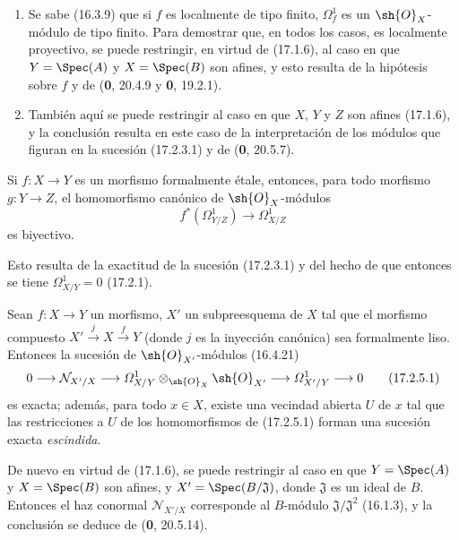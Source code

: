 \begin{enumerate}
  \item[(i)] Se sabe (16.3.9) que si $f$ es localmente de tipo finito, $\varOmega_f^1$ es un $\sh{O}_X$-módulo de tipo finito. Para demostrar que, en todos los casos, es localmente proyectivo, se puede restringir, en virtud de (17.1.6), al caso en que $Y=\Spec(A)$ y $X=\Spec(B)$ son afines, y esto resulta de la hipótesis sobre $f$ y de (\textbf 0, 20.4.9 y \textbf 0, 19.2.1).
  \item[(ii)] También aquí se puede restringir al caso en que $X$, $Y$ y $Z$ son afines (17.1.6), y la conclusión resulta en este caso de la interpretación de los módulos que figuran en la sucesión (17.2.3.1) y de (\textbf 0, 20.5.7).
\end{enumerate}

\begin{corollary}[17.2.4]
\label{IV.17.2.4}
Si $f:X\to Y$ es un morfismo formalmente étale, entonces, para todo morfismo $g:Y\to Z$, el homomorfismo canónico de $\sh{O}_X$-módulos
\[
  f^*(\varOmega_{Y/Z}^1)\longrightarrow\varOmega_{X/Z}^1
\]
es biyectivo.
\end{corollary}

Esto resulta de la exactitud de la sucesión (17.2.3.1) y del hecho de que entonces se tiene $\varOmega_{X/Y}^1=0$ (17.2.1).

\begin{proposition}[17.2.5]
\label{IV.17.2.5}
Sean $f:X\to Y$ un morfismo, $X'$ un subpreesquema de $X$ tal que el morfismo compuesto $X'\xrightarrow{j}X\xrightarrow{f}Y$ (donde $j$ es la inyección canónica) sea formalmente liso. Entonces la sucesión de $\sh{O}_{X'}$-módulos \textup{(16.4.21)}
\[
\label{IV.17.2.5.1}
  0\longrightarrow\mathcal{N}_{X'/X}\longrightarrow\varOmega_{X/Y}^1\otimes_{\sh{O}_X}\sh{O}_{X'}\longrightarrow\varOmega_{X'/Y}^1\longrightarrow0
  \tag{17.2.5.1}
\]
es exacta; además, para todo $x\in X$, existe una vecindad abierta $U$ de $x$ tal que las restricciones a $U$ de los homomorfismos de \textup{(17.2.5.1)} forman una sucesión exacta \emph{escindida}.
\end{proposition}

De nuevo en virtud de (17.1.6), se puede restringir al caso en que $Y=\Spec(A)$ y $X=\Spec(B)$ son afines, y $X'=\Spec(B/\mathfrak{J})$, donde $\mathfrak{J}$ es un ideal de $B$. Entonces el haz conormal $\mathcal{N}_{X'/X}$ corresponde al $B$-módulo $\mathfrak{J}/\mathfrak{J}^2$ (16.1.3), y la conclusión se deduce de (\textbf 0, 20.5.14).

